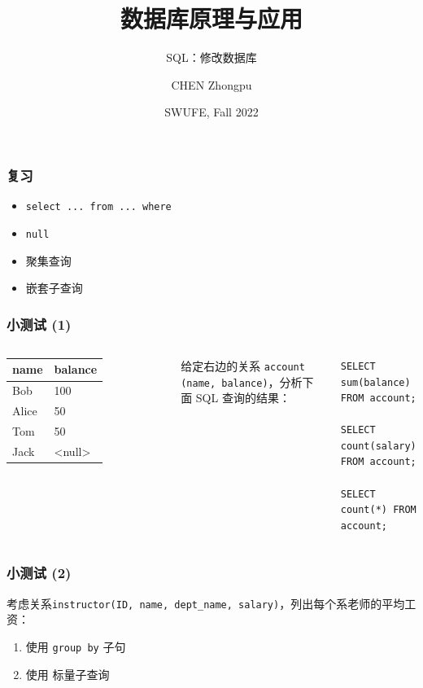 \documentclass[aspectratio=169, 14pt]{beamer}
\title[Database Principles and Applications] %
{数据库原理与应用}
\subtitle{SQL：修改数据库}
\author[CHEN Zhongpu] %
{CHEN Zhongpu}
\institute[] %
{
  School of Computing and Artificial Intelligence \\
  \href{mailto:zpchen@swufe.edu.cn}{zpchen@swufe.edu.cn}
}
\date[] %
{SWUFE, Fall 2022}
\begin{document}
\frame{\titlepage}

\begin{frame}
    \frametitle{复习}
    \begin{itemize}
        \item \texttt{select ... from ... where}
        \item \texttt{null}
        \item 聚集查询
        \item 嵌套子查询
    \end{itemize}
\end{frame}

\begin{frame}[fragile]
    \frametitle{小测试 (1)}

\begin{columns}
    \begin{table}
        \begin{tabular}{ll}
          \toprule
          name & balance \\
          \midrule
          Bob & 100 \\
          Alice & 50 \\
          Tom & 50 \\
          Jack & <null> \\
          \bottomrule
        \end{tabular}
    \end{table}
    给定右边的关系 \texttt{account (name, balance)}，分析下面 SQL 查询的结果：

    \begin{verbatim} 
SELECT sum(balance) FROM account;

SELECT count(salary) FROM account;

SELECT count(*) FROM account;
    \end{verbatim}

\end{columns}
    
\end{frame}

\begin{frame}
    \frametitle{小测试 (2)}
    考虑关系\texttt{instructor(ID, name, dept\_name, salary)}，列出每个系老师的平均工资：

\begin{enumerate}
    \item 使用 \texttt{group by} 子句
    \item 使用 标量子查询
\end{enumerate}

\end{frame}
\end{document}
